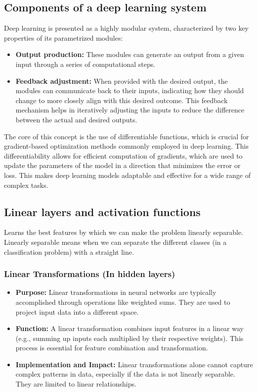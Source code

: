 \documentclass{article}
\begin{document}
\subsection{Components of a deep learning system}
Deep learning is presented as a highly modular system, characterized by two key properties of its parametrized modules:

\begin{itemize}
    \item \textbf{Output production:} These modules can generate an output from a given input through a series of computational steps.
    \item \textbf{Feedback adjustment:} When provided with the desired output, the modules can communicate back to their inputs, indicating how they should change to more closely align with this desired outcome. This feedback mechanism helps in iteratively adjusting the inputs to reduce the difference between the actual and desired outputs.
\end{itemize}

The core of this concept is the use of differentiable functions, which is crucial for gradient-based optimization methods commonly employed in deep learning. This differentiability allows for efficient computation of gradients, which are used to update the parameters of the model in a direction that minimizes the error or loss. This makes deep learning models adaptable and effective for a wide range of complex tasks.

\subsection{Linear layers and activation functions}
Learns the best features by which we can make the problem linearly 
separable. Linearly separable means when we can separate the different classes (in a classification
problem) with a straight line.

\subsubsection{Linear Transformations (In hidden layers)}
\begin{itemize}
    \item \textbf{Purpose:} Linear transformations in neural networks are typically accomplished through operations like weighted sums. They are used to project input data into a different space.
    \item \textbf{Function:} A linear transformation combines input features in a linear way (e.g., summing up inputs each multiplied by their respective weights). This process is essential for feature combination and transformation.
    \item \textbf{Implementation and Impact:} Linear transformations alone cannot capture complex patterns in data, especially if the data is not linearly separable. They are limited to linear relationships.
\end{itemize}
\end{document}
